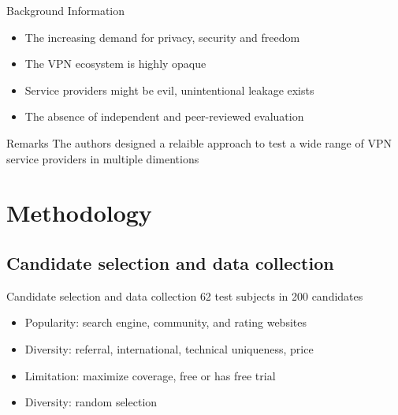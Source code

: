 \documentclass{beamer}
\begin{document}
\begin{frame}{Background Information}
  \begin{itemize}
    \item The increasing demand for privacy, security and freedom
    \item The VPN ecosystem is highly opaque \pause{}
    \item Service providers might be evil, unintentional leakage exists
    \item The absence of independent and peer-reviewed evaluation \pause{}
  \end{itemize}

  \begin{block}{Remarks}
    The authors designed a relaible approach to test a wide range of VPN service providers in multiple dimentions
  \end{block}
\end{frame}

\section{Methodology}

\subsection{Candidate selection and data collection}

\begin{frame}{Candidate selection and data collection}
  \colorbox{blue!40}{62} test subjects in \colorbox{DALYellow}{200} candidates
  \begin{itemize}
    \item \colorbox{DALYellow}{Popularity}: search engine, community, and rating websites
    \item \colorbox{DALYellow}{Diversity}: referral, international, technical uniqueness, price \pause{}
    \item \colorbox{blue!40}{Limitation}: maximize coverage, free or has free trial
    \item \colorbox{blue!40}{Diversity}: random selection \pause{}
  \end{itemize}
\end{frame}
\end{document}

